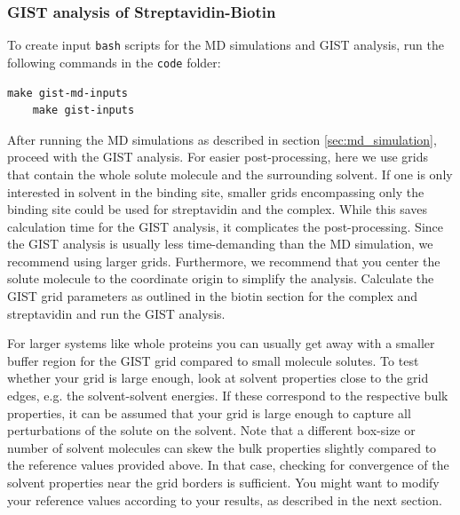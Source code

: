 \documentclass[9pt,tutorial]{livecoms}
\newcommand{\code}{\texttt}
\begin{document}
\subsubsection{GIST analysis of Streptavidin-Biotin}
To create input \code{bash} scripts for the MD simulations and GIST analysis, run the following commands in the \code{code} folder:
\begin{lstlisting}[style=bash]
	make gist-md-inputs
	make gist-inputs
\end{lstlisting}
After running the MD simulations as described in section \ref{sec:md_simulation}, proceed with the GIST analysis.
For easier post-processing, here we use grids that contain the whole solute molecule and the surrounding solvent.
If one is only interested in solvent in the binding site, smaller grids encompassing only the binding site could be used for streptavidin and the complex.
While this saves calculation time for the GIST analysis, it complicates the post-processing.
Since the GIST analysis is usually less time-demanding than the MD simulation, we recommend using larger grids.
Furthermore, we recommend that you center the solute molecule to the coordinate origin to simplify the analysis.
Calculate the GIST grid parameters as outlined in the biotin section for the complex and streptavidin and run the GIST analysis.

For larger systems like whole proteins you can usually get away with a smaller buffer region for the GIST grid compared to small molecule solutes.
To test whether your grid is large enough, look at solvent properties close to the grid edges, e.g. the solvent-solvent energies.
If these correspond to the respective bulk properties, it can be assumed that your grid is large enough to capture all perturbations of the solute on the solvent.
Note that a different box-size or number of solvent molecules can skew the bulk properties slightly compared to the reference values provided above.
In that case, checking for convergence of the solvent properties near the grid borders is sufficient. You might want to modify your reference values according to your results, as described in the next section.
\end{document}
